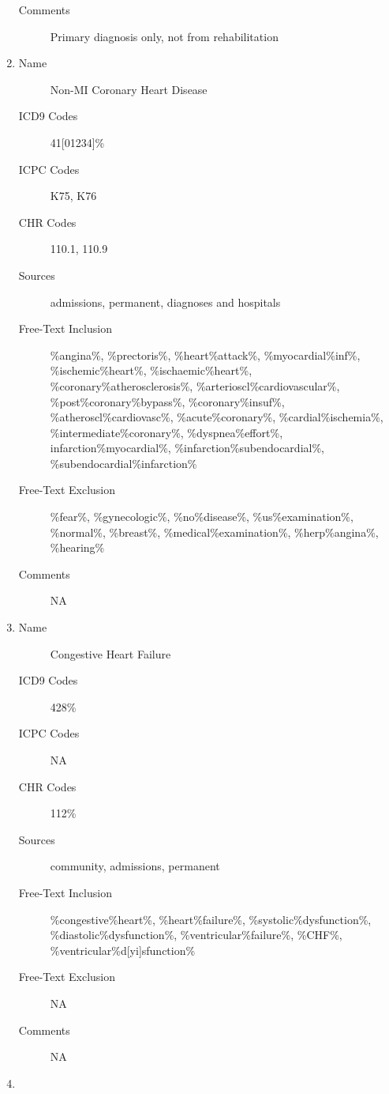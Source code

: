 \documentclass[a4paper,12pt]{article}
\begin{document}
\begin{appendices}
\begin{enumerate}
\begin{description}
   						\item[Comments] Primary diagnosis only, not from rehabilitation
   					\end{description}
   					\item 
   					\begin{description}
   						\item[Name] Non-MI Coronary Heart Disease
   						\item[ICD9 Codes] 41[01234]\%
   						\item[ICPC Codes] K75, K76
   						\item[CHR Codes] 110.1, 110.9
   						\item[Sources] admissions, permanent, diagnoses  and hospitals
   						\item[Free-Text Inclusion] \%angina\%, \%prectoris\%, \%heart\%attack\%, \%myocardial\%inf\%, \%ischemic\%heart\%, \%ischaemic\%heart\%, \%coronary\%atherosclerosis\%, \%arterioscl\%cardiovascular\%, \%post\%coronary\%bypass\%, \%coronary\%insuf\%, \%atheroscl\%cardiovasc\%, \%acute\%coronary\%, \%cardial\%ischemia\%, \%intermediate\%coronary\%, \%dyspnea\%effort\%, infarction\%myocardial\%, \%infarction\%subendocardial\%, \%subendocardial\%infarction\%
   						\item[Free-Text Exclusion] \%fear\%, \%gynecologic\%, \%no\%disease\%, \%us\%examination\%, \%normal\%, \%breast\%, \%medical\%examination\%, \%herp\%angina\%, \%hearing\%
   						\item[Comments] NA
   					\end{description}
   					\item
   					\begin{description}
   						\item[Name] Congestive Heart Failure
   						\item[ICD9 Codes] 428\%
   						\item[ICPC Codes] NA
   						\item[CHR Codes] 112\%
   						\item[Sources] community, admissions, permanent
   						\item[Free-Text Inclusion] \%congestive\%heart\%, \%heart\%failure\%, \%systolic\%dysfunction\%, \%diastolic\%dysfunction\%, \%ventricular\%failure\%, \%CHF\%, \%ventricular\%d[yi]sfunction\%
   						\item[Free-Text Exclusion] NA
   						\item[Comments] NA
   					\end{description}
   					\item

\end{enumerate}
\end{appendices}
\end{document}
